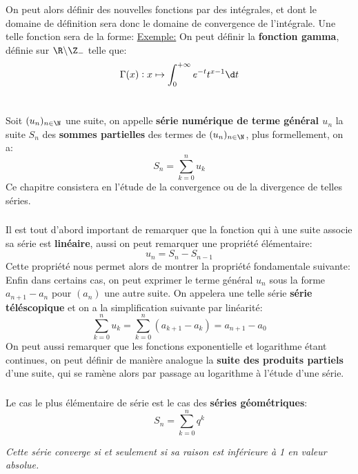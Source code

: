 \subsection*{}
On peut alors définir des nouvelles fonctions par des intégrales, et dont le domaine de définition sera donc le domaine de convergence de l'intégrale. Une telle fonction sera de la forme:
\underline{Exemple:} On peut définir la \textbf{fonction gamma}, définie sur \(\R \backslash \Z_-\) telle que:
\[
   \Gamma(x): x \mapsto \int_{0}^{+\infty} e^{-t}t^{x-1} \d t   
\]

\chapter*{}
Soit \((u_n)_{n\in\N}\) une suite, on appelle \textbf{série numérique de terme général \(u_n\)} la suite \(S_n\) des \textbf{sommes partielles} des termes de \((u_n)_{n\in\N}\), plus formellement, on a:
\[
   S_n = \sum_{k=0}^{n} u_k   
\]
Ce chapitre consistera en l'étude de la convergence ou de la divergence de telles séries. 
\subsection*{}
Il est tout d'abord important de remarquer que la fonction qui à une suite associe sa série est \textbf{linéaire}, aussi on peut remarquer une propriété élémentaire:
\[
   u_n = S_{n} - S_{n-1}   
\]
Cette propriété nous permet alors de montrer la propriété fondamentale suivante:
Enfin dans certains cas, on peut exprimer le terme général \(u_n\) sous la forme \(a_{n+1} - a_n\) pour \((a_n)\) une autre suite. On appelera une telle série \textbf{série téléscopique} et on a la simplification suivante par linéarité:
\[
   \sum_{k=0}^{n} u_k = \sum_{k=0}^{n} (a_{k+1} - a_k) = a_{n+1} - a_0   
\]
On peut aussi remarquer que les fonctions exponentielle et logarithme étant continues, on peut définir de manière analogue la \textbf{suite des produits partiels} d'une suite, qui se ramène alors par passage au logarithme à l'étude d'une série.
\subsection*{}
Le cas le plus élémentaire de série est le cas des \textbf{séries géométriques}:
\[
   S_n = \sum_{k=0}^{n} q^k
\]
\begin{center}
   \textit{Cette série converge si et seulement si sa raison est inférieure à 1 en valeur absolue.}
\end{center}

